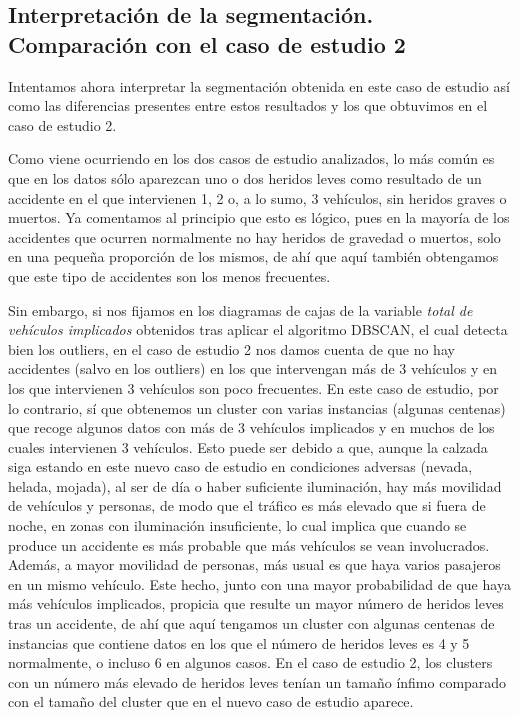 \documentclass[a4paper,11pt]{book}
\begin{document}
\subsection{Interpretación de la segmentación. \\ Comparación con el caso de estudio 2}

Intentamos ahora interpretar la segmentación obtenida en este caso de estudio así como las diferencias presentes entre estos resultados y los que obtuvimos en el caso de estudio 2. 

Como viene ocurriendo en los dos casos de estudio analizados, lo más común es que en los datos sólo aparezcan uno o dos heridos leves como resultado de un accidente en el que intervienen 1, 2 o, a lo sumo, 3 vehículos, sin heridos graves o muertos. Ya comentamos al principio que esto es lógico, pues en la mayoría de los accidentes que ocurren normalmente no hay heridos de gravedad o muertos, solo en una pequeña proporción de los mismos, de ahí que aquí también obtengamos que este tipo de accidentes son los menos frecuentes. 

Sin embargo, si nos fijamos en los diagramas de cajas de la variable \textit{total de vehículos implicados} obtenidos tras aplicar el algoritmo DBSCAN, el cual detecta bien los outliers, en el caso de estudio 2 nos damos cuenta de que no hay accidentes (salvo en los outliers) en los que intervengan más de 3 vehículos y en los que intervienen 3 vehículos son poco frecuentes. En este caso de estudio, por lo contrario, sí que obtenemos un cluster con varias instancias (algunas centenas) que recoge algunos datos con más de 3 vehículos implicados y en muchos de los cuales intervienen 3 vehículos. Esto puede ser debido a que, aunque la calzada siga estando en este nuevo caso de estudio en condiciones adversas (nevada, helada, mojada), al ser de día o haber suficiente iluminación, hay más movilidad de vehículos y personas, de modo que el tráfico es más elevado que si fuera de noche, en zonas con iluminación insuficiente, lo cual implica que cuando se produce un accidente es más probable que más vehículos se vean involucrados. Además, a mayor movilidad de personas, más usual es que haya varios pasajeros en un mismo vehículo. Este hecho, junto con una mayor probabilidad de que haya más vehículos implicados, propicia que resulte un mayor número de heridos leves tras un accidente, de ahí que aquí tengamos un cluster con algunas centenas de instancias que contiene datos en los que el número de heridos leves es 4 y 5 normalmente, o incluso 6 en algunos casos. En el caso de estudio 2, los clusters con un número más elevado de heridos leves tenían un tamaño ínfimo comparado con el tamaño del cluster que en el nuevo caso de estudio aparece. 
\end{document}

